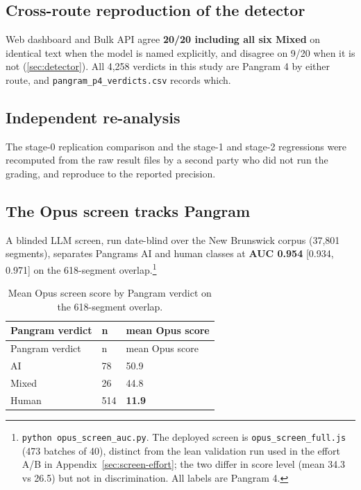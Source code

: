 \subsection{Cross-route reproduction of the detector}\label{sec:cross-route}

Web dashboard and Bulk API agree \textbf{20/20 including all six Mixed} on
identical text when the model is named explicitly, and disagree on 9/20 when
it is not (\cref{sec:detector}). All 4,258 verdicts in this study are Pangram 4 by either
route, and \texttt{pangram\_\allowbreak{}p4\_\allowbreak{}verdicts.\allowbreak{}csv} records which.

\subsection{Independent re-analysis}\label{sec:reanalysis}

The stage-0 replication comparison and the stage-1 and stage-2 regressions
were recomputed from the raw result files by a second party who did not run
the grading, and reproduce to the reported precision.

\subsection{The Opus screen tracks Pangram}\label{sec:screen-pangram}

A blinded LLM screen, run date-blind over the New Brunswick corpus (37,801
segments), separates Pangram\textquotesingle s AI and human classes at \textbf{AUC 0.954} {[}0.934,
0.971{]} on the 618-segment overlap.\footnote{\texttt{python\ opus\_\allowbreak{}screen\_\allowbreak{}auc.\allowbreak{}py}. The deployed screen is
  \texttt{opus\_screen\_full.js} (473 batches of 40), distinct from the lean
  validation run used in the effort A/B in Appendix~\ref{sec:screen-effort}; the two differ in
  score level (mean 34.3 vs 26.5) but not in discrimination. All labels are
  Pangram 4.}

\begingroup\small
\begin{longtable}[]{@{}lll@{}}
\caption{Mean Opus screen score by Pangram verdict on the 618-segment overlap.}\label{tab:screen-by-verdict}\\
\toprule\noalign{}
Pangram verdict & n & mean Opus score \\
\midrule\noalign{}
\endfirsthead
\toprule\noalign{}
Pangram verdict & n & mean Opus score \\
\midrule\noalign{}
\endhead
\bottomrule\noalign{}
\endlastfoot
AI & 78 & 50.9 \\
Mixed & 26 & 44.8 \\
Human & 514 & \textbf{11.9} \\
\end{longtable}
\endgroup

